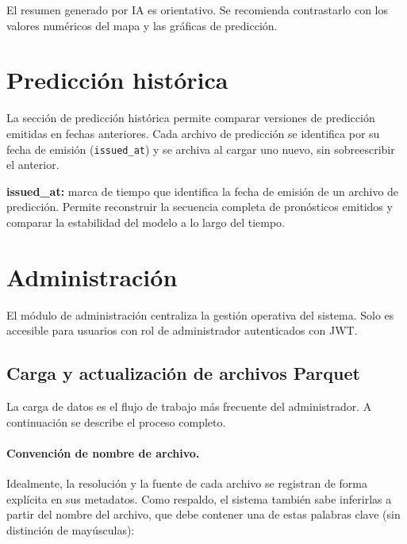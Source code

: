\begin{remark}
El resumen generado por IA es orientativo. Se recomienda contrastarlo con los valores numéricos del mapa y las gráficas de predicción.
\end{remark}

\section{Predicción histórica}
\label{sec:prediccion_historica}

La sección de predicción histórica permite comparar versiones de predicción emitidas en fechas anteriores. Cada archivo de predicción se identifica por su fecha de emisión (\texttt{issued\_at}) y se archiva al cargar uno nuevo, sin sobreescribir el anterior.

\begin{definition}
\textbf{issued\_at:} marca de tiempo que identifica la fecha de emisión de un archivo de predicción. Permite reconstruir la secuencia completa de pronósticos emitidos y comparar la estabilidad del modelo a lo largo del tiempo.
\end{definition}

\section{Administración}
\label{sec:administracion_func}

El módulo de administración centraliza la gestión operativa del sistema. Solo es accesible para usuarios con rol de administrador autenticados con JWT.

\subsection*{Carga y actualización de archivos Parquet}

La carga de datos es el flujo de trabajo más frecuente del administrador. A continuación se describe el proceso completo.

\paragraph{Convención de nombre de archivo.} Idealmente, la resolución y la fuente de cada archivo se registran de forma explícita en sus metadatos. Como respaldo, el sistema también sabe inferirlas a partir del nombre del archivo, que debe contener una de estas palabras clave (sin distinción de mayúsculas):

